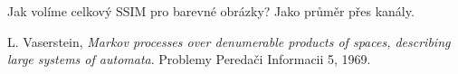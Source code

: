 \documentclass[czech]{article}
\begin{document}

Jak volíme celkový SSIM pro barevné obrázky?
Jako průměr přes kanály.

\begin{thebibliography}{1}

 L. Vaserstein,
\emph{Markov processes over denumerable products of spaces, describing large systems of automata}.
Problemy Peredači Informacii 5, 1969.

\end{thebibliography}
\end{document}
